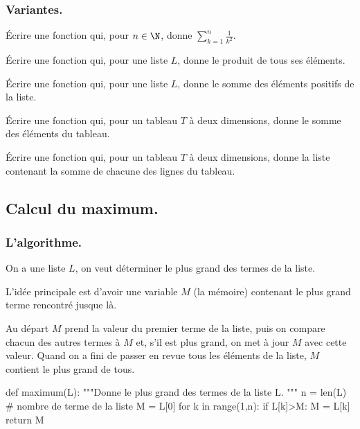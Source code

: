 \documentclass[french,11pt,twoside]{VcCours}
\begin{document}
\pagebreak
\subsubsection{Variantes.}
\begin{Exercice}{}
Écrire une fonction  qui, pour $n\in\N$, donne
$\sum_{k=1}^n\frac{1}{k^2}$.
\end{Exercice}

\begin{Exercice}{}
Écrire une fonction  qui, pour une liste $L$, donne
le produit de tous ses éléments.
\end{Exercice}

\begin{Exercice}{}
Écrire une fonction  qui, pour une
liste $L$, donne le somme des éléments positifs de la liste.
\end{Exercice}

\begin{Exercice}{}
Écrire une fonction  qui, pour un
tableau $T$ à deux dimensions, donne le somme des éléments du tableau.
\end{Exercice}

\begin{Exercice}{}
Écrire une fonction  qui, pour un
tableau $T$ à deux dimensions, donne la liste contenant la somme de
chacune des lignes du tableau.
\end{Exercice}

\newpage
\subsection{Calcul du maximum.}
\subsubsection{L'algorithme.}
On a une liste $L$, on veut déterminer le plus grand des termes
de la liste.

L'idée principale est d'avoir une variable $M$ (la mémoire)
contenant le plus grand terme rencontré jusque là.

Au départ $M$ prend la valeur du premier terme de la liste, puis on compare
chacun des autres termes à $M$ et, s'il est plus grand, on met à jour $M$ avec
cette valeur.
Quand on a fini de passer en revue tous les éléments de la liste, $M$ contient
le plus grand de tous.

\begin{Python}
def maximum(L):
    """Donne le plus grand des termes de la liste L.
    """
    n = len(L) # nombre de terme de la liste
    M = L[0]
    for k in range(1,n):
        if L[k]>M:
            M = L[k]
    return M
\end{Python}
\end{document}
